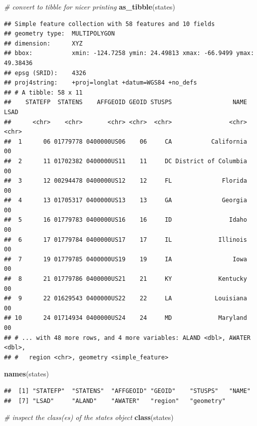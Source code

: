 \documentclass[]{book}
\newenvironment{Shaded}{\begin{snugshade}}{\end{snugshade}}
\newcommand{\KeywordTok}[1]{\textcolor[rgb]{0.13,0.29,0.53}{\textbf{{#1}}}}
\newcommand{\CommentTok}[1]{\textcolor[rgb]{0.56,0.35,0.01}{\textit{{#1}}}}
\newcommand{\NormalTok}[1]{{#1}}
\theoremstyle{definition}
\theoremstyle{definition}
\theoremstyle{definition}
\theoremstyle{remark}
\begin{document}
\begin{Shaded}
\begin{Highlighting}[]
\CommentTok{# convert to tibble for nicer printing}
\KeywordTok{as_tibble}\NormalTok{(states)}
\end{Highlighting}
\end{Shaded}

\begin{verbatim}
## Simple feature collection with 58 features and 10 fields
## geometry type:  MULTIPOLYGON
## dimension:      XYZ
## bbox:           xmin: -124.7258 ymin: 24.49813 xmax: -66.9499 ymax: 49.38436
## epsg (SRID):    4326
## proj4string:    +proj=longlat +datum=WGS84 +no_defs
## # A tibble: 58 x 11
##    STATEFP  STATENS    AFFGEOID GEOID STUSPS                 NAME  LSAD
##      <chr>    <chr>       <chr> <chr>  <chr>                <chr> <chr>
##  1      06 01779778 0400000US06    06     CA           California    00
##  2      11 01702382 0400000US11    11     DC District of Columbia    00
##  3      12 00294478 0400000US12    12     FL              Florida    00
##  4      13 01705317 0400000US13    13     GA              Georgia    00
##  5      16 01779783 0400000US16    16     ID                Idaho    00
##  6      17 01779784 0400000US17    17     IL             Illinois    00
##  7      19 01779785 0400000US19    19     IA                 Iowa    00
##  8      21 01779786 0400000US21    21     KY             Kentucky    00
##  9      22 01629543 0400000US22    22     LA            Louisiana    00
## 10      24 01714934 0400000US24    24     MD             Maryland    00
## # ... with 48 more rows, and 4 more variables: ALAND <dbl>, AWATER <dbl>,
## #   region <chr>, geometry <simple_feature>
\end{verbatim}

\begin{Shaded}
\begin{Highlighting}[]
\KeywordTok{names}\NormalTok{(states)}
\end{Highlighting}
\end{Shaded}

\begin{verbatim}
##  [1] "STATEFP"  "STATENS"  "AFFGEOID" "GEOID"    "STUSPS"   "NAME"    
##  [7] "LSAD"     "ALAND"    "AWATER"   "region"   "geometry"
\end{verbatim}

\begin{Shaded}
\begin{Highlighting}[]
\CommentTok{# inspect the class(es) of the states object}
\KeywordTok{class}\NormalTok{(states)}
\end{Highlighting}
\end{Shaded}
\end{document}
